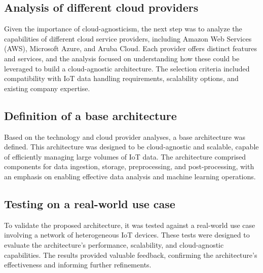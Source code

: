 \subsection{Analysis of different cloud providers}
\label{sec:analysis-of-different-cloud-providers}
Given the importance of cloud-agnosticism, the next step was to analyze the capabilities of different cloud service providers, including Amazon Web Services (AWS)\cite{site:aws}, Microsoft Azure\cite{site:azure}, and Aruba Cloud\cite{site:aruba-cloud}. Each provider offers distinct features and services, and the analysis focused on understanding how these could be leveraged to build a cloud-agnostic architecture. The selection criteria included compatibility with IoT data handling requirements, scalability options, and existing company expertise.

\subsection{Definition of a base architecture}
\label{sec:definition-of-a-base-architecture}
Based on the technology and cloud provider analyses, a base architecture was defined. This architecture was designed to be cloud-agnostic and scalable, capable of efficiently managing large volumes of IoT data. The architecture comprised components for data ingestion, storage, preprocessing, and post-processing, with an emphasis on enabling effective data analysis and machine learning operations.

\subsection{Testing on a real-world use case}
\label{sec:testing-on-a-real-world-use-case}
To validate the proposed architecture, it was tested against a real-world use case involving a network of heterogeneous IoT devices. These tests were designed to evaluate the architecture's performance, scalability, and cloud-agnostic capabilities. The results provided valuable feedback, confirming the architecture's effectiveness and informing further refinements.